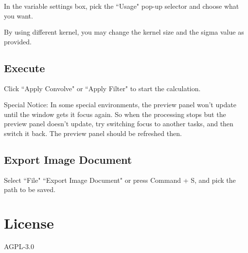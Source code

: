 \documentclass[11pt, oneside]{article}   	%
\begin{document}
\hspace{14pt} In the variable settings box, pick the ``Usage" pop-up selector and choose what you want.

By using different kernel, you may change the kernel size and the sigma value as provided.

\subsection*{Execute}

\hspace{13pt} Click ``Apply Convolve" or ``Apply Filter" to start the calculation.

Special Notice: In some special environments, the preview panel won't update until the window gets it focus again. So when the processing stops but the preview panel doesn't update, try switching focus to another tasks, and then switch it back. The preview panel should be refreshed then.

\subsection*{Export Image Document}

\hspace{14pt} Select ``File" \- ``Export Image Document" or press Command + S, and pick the path to be saved.

\section*{License}

AGPL-3.0
\end{document}
